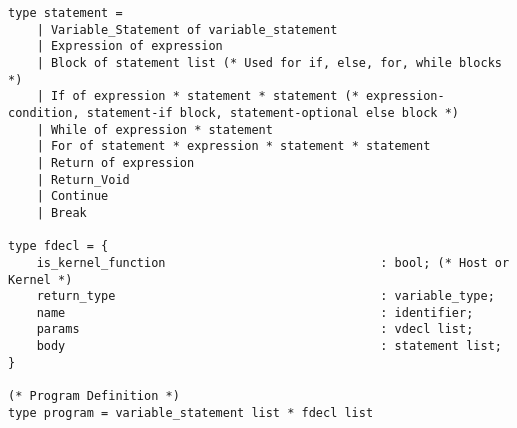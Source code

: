 \begin{verbatim}
type statement = 
    | Variable_Statement of variable_statement
    | Expression of expression
    | Block of statement list (* Used for if, else, for, while blocks *)
    | If of expression * statement * statement (* expression-condition, statement-if block, statement-optional else block *)
    | While of expression * statement
    | For of statement * expression * statement * statement
    | Return of expression
    | Return_Void
    | Continue
    | Break
    
type fdecl = {
    is_kernel_function                              : bool; (* Host or Kernel *)
    return_type                                     : variable_type;
    name                                            : identifier;
    params                                          : vdecl list;    
    body                                            : statement list;
}

(* Program Definition *)
type program = variable_statement list * fdecl list
\end{verbatim}	